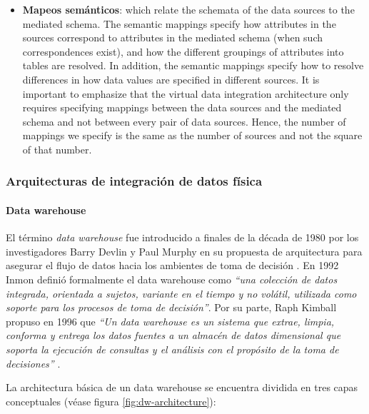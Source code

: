 \begin{itemize}
    \item \textbf{Mapeos semánticos}: which relate the schemata of the data sources to the mediated schema. The semantic mappings specify how attributes in the sources correspond to attributes in the mediated schema (when such correspondences exist), and how the different groupings of attributes into tables are resolved. In addition, the semantic mappings specify how to resolve differences in how data values are specified in different sources. It is important to emphasize that the virtual data integration architecture only requires specifying mappings between the data sources and the mediated schema and not between every pair of data sources. Hence, the number of mappings we specify is the same as the number of sources and not the square of that number.
\end{itemize}

\subsubsection{Arquitecturas de integración de datos física}

\paragraph{Data warehouse\newline}

El término \textit{data warehouse} fue introducido a finales de la década de 1980 por los investigadores Barry Devlin y Paul Murphy en
su propuesta de arquitectura para asegurar el flujo de datos hacia los ambientes de toma de decisión \cite{Devlin1988AnAF}. En 1992 Inmon \cite{inmon1992building} definió formalmente
el data warehouse como \textit{``una colección de datos integrada, orientada a sujetos, variante en el tiempo y no volátil, utilizada como soporte para los procesos de toma de decisión''}.
Por su parte, Raph Kimball propuso en 1996 que \textit{``Un data warehouse es un sistema que extrae, limpia, conforma y entrega los datos fuentes a un almacén de datos dimensional que soporta la ejecución de consultas y el análisis con el propósito de la toma de decisiones''} \cite{kimball1996data}.

La architectura básica de un data warehouse se encuentra dividida en tres capas conceptuales \cite{kimball2013data,jameel2022analyses,nambiar2022overview} (véase figura \ref{fig:dw-architecture}):

